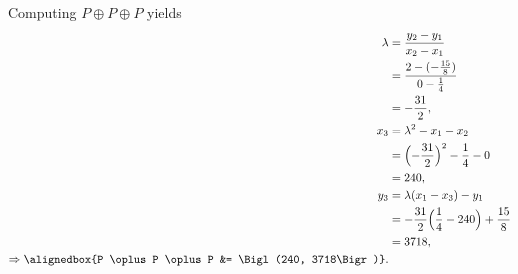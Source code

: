 \documentclass[
  coursecode={MTHE 418},
  assignmentname={Homework \homeworknumber},
  studentnumber=20053722,
  name={Bryan Hoang},
  draft,
]{
  ltxanswer%
}
\begin{document}
\begin{questions}
\begin{parts}
      \part{}
      \begin{solution}
        Computing \(P \oplus P \oplus P\) yields
        \begin{align*}
          \lambda                                     &= \frac{y_{2} - y_{1}}{x_{2} - x_{1}}                        \\
                                                      &= \frac{2 - (-\frac{15}{8})}{0 - \frac{1}{4}}                \\
                                                      &= -\frac{31}{2},                                             \\
          x_{3}                                       &= \lambda^{2} - x_{1} - x_{2}                                \\
                                                      &= \Bigl(-\frac{31}{2}\Bigr)^{2} - \frac{1}{4} - 0            \\
                                                      &= 240,                                                       \\
          y_{3}                                       &= \lambda(x_{1} - x_{3}) - y_{1}                             \\
                                                      &= -\frac{31}{2} \Bigl(\frac{1}{4} - 240\Bigr) + \frac{15}{8} \\
                                                      &= 3718,                                                      \\
          \Rightarrow \alignedbox{P \oplus P \oplus P &= \Bigl(240, 3718\Bigr)}.
        \end{align*}


\end{solution}
\end{parts}
\end{questions}
\end{document}
